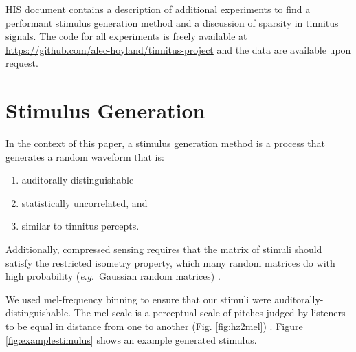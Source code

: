 \documentclass[journal]{IEEEtran}
\newcommand{\eg}{\textit{e}.\textit{g}.\ }
\begin{document}


	






HIS document contains a description of additional experiments to find a performant
stimulus generation method and a discussion of sparsity in tinnitus signals.
The code for all experiments is freely available at \url{https://github.com/alec-hoyland/tinnitus-project}
and the data are available upon request.

\section{Stimulus Generation}

In the context of this paper, a stimulus generation method
is a process that generates a random waveform that is:

\begin{enumerate}
  \item auditorally-distinguishable
  \item statistically uncorrelated, and
  \item similar to tinnitus percepts.
\end{enumerate}

Additionally, compressed sensing requires that the matrix of stimuli
should satisfy the restricted isometry property,
which many random matrices do with high probability (\eg Gaussian random matrices)
\cite{candesRestrictedIsometryProperty2008,candesIntroductionCompressiveSampling2008}.

We used mel-frequency binning to ensure that our stimuli were auditorally-distinguishable.
The mel scale is a perceptual scale of pitches judged by listeners to be equal in distance
from one to another (Fig. \ref{fig:hz2mel}) \cite{hamiltonTopographySpeechrelatedAcoustic2020}.
Figure \ref{fig:examplestimulus} shows an example generated stimulus. 
\end{document}
